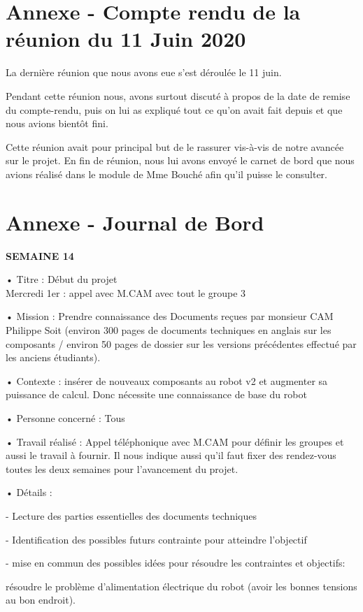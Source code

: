 \documentclass{PackagerQualityN}
\begin{document}
\section{Annexe - Compte rendu de la réunion du 11 Juin 2020}
La dernière réunion que nous avons eue s'est déroulée le 11 juin.


Pendant cette réunion nous, avons surtout discuté à propos de la date de remise du compte-rendu,
puis on lui as expliqué tout ce qu'on avait fait depuis et que nous avions bientôt fini.


Cette réunion avait pour principal but de le rassurer vis-à-vis de notre avancée sur le projet. En fin
de réunion, nous lui avons envoyé le carnet de bord que nous avions réalisé dans le module de Mme
Bouché afin qu'il puisse le consulter.
\newp
\section{Annexe - Journal de Bord}

\textbf{SEMAINE 14}

• Titre : Début du projet
\\
Mercredi 1er : appel avec M.CAM avec tout le groupe 3

• Mission : Prendre connaissance des Documents reçues par monsieur CAM Philippe Soit (environ 300 pages de documents techniques en anglais sur les composants / environ 50 pages de dossier sur les versions précédentes effectué par les anciens étudiants).

• Contexte : insérer de nouveaux composants au robot v2 et augmenter sa puissance de calcul. Donc nécessite une connaissance de base du robot

• Personne concerné : Tous

• Travail réalisé : Appel téléphonique avec M.CAM pour définir les groupes et aussi le travail à fournir. Il nous indique aussi qu’il faut fixer des rendez-vous toutes les deux semaines pour l'avancement du projet.

• Détails :

-          Lecture des parties essentielles des documents techniques

-          Identification des possibles futurs contrainte pour atteindre l’objectif

-          mise en  commun des possibles idées pour résoudre les contraintes et objectifs: 

	résoudre le problème d'alimentation électrique du robot (avoir les bonnes tensions au 
	bon endroit).
	
\end{document}
